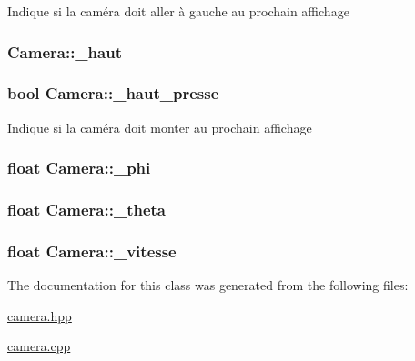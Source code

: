Indique si la caméra doit aller à gauche au prochain affichage \hypertarget{class_camera_af860db197a7abbf0284df4e32a95a347}{
\subsubsection[{\+\_\+haut}]{ Camera\+::\+\_\+haut\hspace{0.3cm}{\ttfamily [protected]}}}\label{class_camera_af860db197a7abbf0284df4e32a95a347}
\hypertarget{class_camera_a43b59b53cb182906d56e6e4d2c31139c}{
\subsubsection[{\+\_\+haut\+\_\+presse}]{\setlength{\rightskip}{0pt plus 5cm}bool Camera\+::\+\_\+haut\+\_\+presse}}\label{class_camera_a43b59b53cb182906d56e6e4d2c31139c}
Indique si la caméra doit monter au prochain affichage \hypertarget{class_camera_a288df53a3ff446ee4367ee47b8499fcd}{
\subsubsection[{\+\_\+phi}]{\setlength{\rightskip}{0pt plus 5cm}float Camera\+::\+\_\+phi\hspace{0.3cm}{\ttfamily [protected]}}}\label{class_camera_a288df53a3ff446ee4367ee47b8499fcd}
\hypertarget{class_camera_aeb3c859c3c254c8296420451259e5629}{
\subsubsection[{\+\_\+theta}]{\setlength{\rightskip}{0pt plus 5cm}float Camera\+::\+\_\+theta\hspace{0.3cm}{\ttfamily [protected]}}}\label{class_camera_aeb3c859c3c254c8296420451259e5629}
\hypertarget{class_camera_a9062fdde515a49bf8db963ac46be9942}{
\subsubsection[{\+\_\+vitesse}]{\setlength{\rightskip}{0pt plus 5cm}float Camera\+::\+\_\+vitesse\hspace{0.3cm}{\ttfamily [protected]}}}\label{class_camera_a9062fdde515a49bf8db963ac46be9942}


The documentation for this class was generated from the following files\+:\begin{DoxyCompactItemize}
\item 
\hyperlink{camera_8hpp}{camera.\+hpp}\item 
\hyperlink{camera_8cpp}{camera.\+cpp}\end{DoxyCompactItemize}

